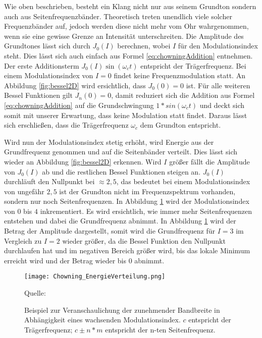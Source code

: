 Wie oben beschrieben, besteht ein Klang nicht nur aus seinem Grundton sondern auch aus Seitenfrequenzbänder. Theoretisch treten unendlich viele solcher Frequenzbänder auf, jedoch werden diese nicht mehr vom Ohr wahrgenommen, wenn sie eine gewisse Grenze an Intensität unterschreiten. Die Amplitude des Grundtones lässt sich durch $J_0(I)$ berechnen, wobei $I$ für den Modulationsindex steht. Dies lässt sich auch einfach aus Formel \ref{eq:chowningAddition} entnehmen. Der erste Additionsterm $J_0(I)\sin(\omega_c t)$ entspricht der Trägerfrequenz. Bei einem Modulationsindex von $I=0$ findet keine Frequenzmodulation statt. An Abbildung \ref{fig:bessel2D} wird ersichtlich, dass $J_0(0)=0$ ist. Für alle weiteren Bessel Funktionen gilt $J_n(0)=0$, damit reduziert sich die Addition aus Formel \ref{eq:chowningAddition} auf die Grundschwingung $1*sin(\omega_c t)$ und deckt sich somit mit unserer Erwartung, dass keine Modulation statt findet. Daraus lässt sich erschließen, dass die Trägerfrequenz $\omega_c$ dem Grundton entspricht.

\label{bulli:besselModIndexZusammenahang}
Wird nun der Modulationsindex stetig erhöht, wird Energie aus der Grundfrequenz genommen und auf die Seitenbänder verteilt. Dies lässt sich wieder an Abbildung \ref{fig:bessel2D} erkennen. Wird $I$ größer fällt die Amplitude von $J_0(I)$ ab und die restlichen Bessel Funktionen steigen an. $J_0(I)$ durchläuft den Nullpunkt bei $\approx2,5$, das bedeutet bei einem Modulationsindex von ungefähr $2,5$ ist der Grundton nicht im Frequenzspektrum vorhanden, sondern nur noch Seitenfrequenzen. In Abbildung \ref{fig:chowningEnergieVerteilung} wird der Modulationsindex von $0$ bis $4$ inkrementiert. Es wird ersichtlich, wie immer mehr Seitenfrequenzen entstehen und dabei die Grundfrequenz abnimmt. In Abbildung \ref{fig:chowningEnergieVerteilung} wird der Betrag der Amplitude dargestellt, somit wird die Grundfrequenz für $I=3$ im Vergleich zu $I=2$ wieder größer, da die Bessel Funktion den Nullpunkt durchlaufen hat und im negativen Bereich größer wird, bis das lokale Minimum erreicht wird und der Betrag wieder bis $0$ abnimmt.

\begin{figure} [ht]
\centering
  \texttt{[image: Chowning\_EnergieVerteilung.png]}
\caption{Beispiel zur Veranschaulichung der zunehmender Bandbreite in Abhängigkeit eines wachsenden Modulationsindex. $c$ entspricht der Trägerfrequenz; $c\pm n*m$ entspricht der n-ten Seitenfrequenz.}
\label{fig:chowningEnergieVerteilung}
Quelle: \cite{chowningPaper}
\end{figure}
\FloatBarrier

